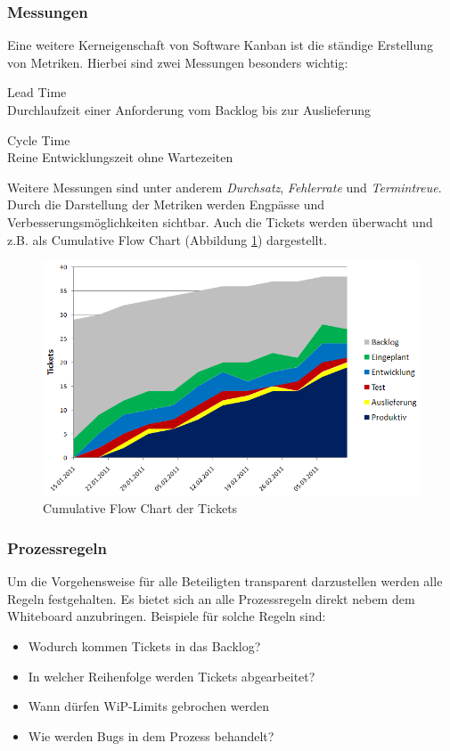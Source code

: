 \subsubsection{Messungen}
Eine weitere Kerneigenschaft von Software Kanban ist die ständige Erstellung von Metriken. Hierbei sind zwei Messungen besonders wichtig:
\begin{description}
  \item Lead Time\\ Durchlaufzeit einer Anforderung vom Backlog bis zur Auslieferung
  \item Cycle Time\\ Reine Entwicklungszeit ohne Wartezeiten
\end{description}
Weitere Messungen sind unter anderem \emph{Durchsatz}, \emph{Fehlerrate} und \emph{Termintreue}. Durch die Darstellung der Metriken werden Engpässe und Verbesserungsmöglichkeiten sichtbar. Auch die Tickets werden überwacht und z.B. als Cumulative Flow Chart (Abbildung \ref{fig:kanbanChart}) dargestellt.

\begin{figure}[h]
  \centering
  \includegraphics[width=1\textwidth]{images/kanbanChart}
  \caption{Cumulative Flow Chart der Tickets}
  \label{fig:kanbanChart}
\end{figure}

\subsubsection{Prozessregeln}
Um die Vorgehensweise für alle Beteiligten transparent darzustellen werden alle Regeln festgehalten. Es bietet sich an alle Prozessregeln direkt nebem dem Whiteboard anzubringen. Beispiele für solche Regeln sind:
\begin{itemize}
  \item Wodurch kommen Tickets in das Backlog?
  \item In welcher Reihenfolge werden Tickets abgearbeitet?
  \item Wann dürfen WiP-Limits gebrochen werden
  \item Wie werden Bugs in dem Prozess behandelt?
\end{itemize}


